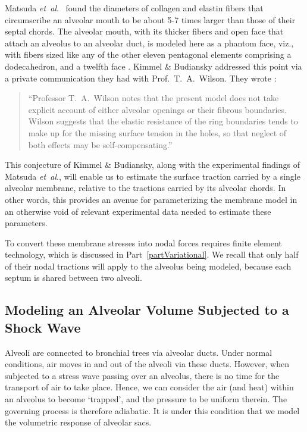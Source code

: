 Matsuda \textit{et~al}.\ \cite{Matsudaetal87} found the diameters of collagen and elastin fibers that circumscribe an alveolar mouth to be about 5-7 times larger than those of their septal chords.  The alveolar mouth, with its thicker fibers and open face that attach an alveolus to an alveolar duct, is modeled here as a phantom face, viz., with fibers sized like any of the other eleven pentagonal elements comprising a dodecahedron, and a twelfth face \cite{Freedetal12}.  Kimmel \& Budiansky addressed this point via a private communication they had with Prof.\ T.\ A.\ Wilson.  They wrote \cite{KimmelBudiansky90}:
\small
\begin{quote}
	``Professor T.\ A.\ Wilson notes that the present model does not take explicit account of either alveolar openings or their fibrous boundaries.  Wilson suggests that the elastic resistance of the ring boundaries tends to make up for the missing surface tension in the holes, so that neglect of both effects may be self-compensating.''
\end{quote}
\normalsize
This conjecture of Kimmel \& Budiansky, along with the experimental findings of Matsuda \textit{et~al}., will enable us to estimate the surface traction carried by a single alveolar membrane, relative to the tractions carried by its alveolar chords.  In other words, this provides an avenue for parameterizing the membrane model in an otherwise void of relevant experimental data needed to estimate these parameters.

To convert these membrane stresses into nodal forces requires finite element technology, which is discussed in Part~\ref{partVariational}.  We recall that only half of their nodal tractions will apply to the alveolus being modeled, because each septum is shared between two alveoli.

\subsection{Modeling an Alveolar Volume Subjected to a Shock Wave}
\label{sec:IdealGasLaw}

Alveoli are connected to bronchial trees via alveolar ducts.  Under normal conditions, air moves in and out of the alveoli via these ducts.  However, when subjected to a stress wave passing over an alveolus, there is no time for the transport of air to take place.  Hence, we can consider the air (and heat) within an alveolus to become `trapped', and the pressure to be uniform therein.  The governing process is therefore adiabatic.  It is under this condition that we model the volumetric response of alveolar sacs.

